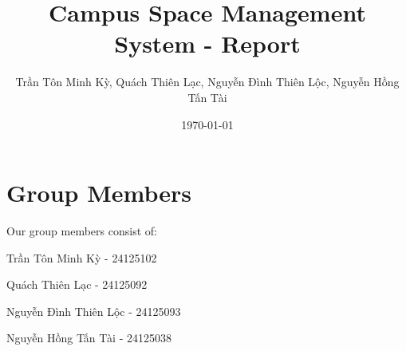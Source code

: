 \documentclass{exam}
\title{Campus Space Management System - Report}
\author{\foreignlanguage{vietnamese}{Trần Tôn Minh Kỳ, Quách Thiên Lạc, Nguyễn Đình Thiên Lộc, Nguyễn Hồng Tấn Tài}}
\date{\today}
\begin{document}
\maketitle
\section{Group Members}
Our group members consist of:

\foreignlanguage{vietnamese}{Trần Tôn Minh Kỳ} - 24125102

\foreignlanguage{vietnamese}{Quách Thiên Lạc} - 24125092

\foreignlanguage{vietnamese}{Nguyễn Đình Thiên Lộc} - 24125093

\foreignlanguage{vietnamese}{Nguyễn Hồng Tấn Tài} - 24125038
\end{document}
